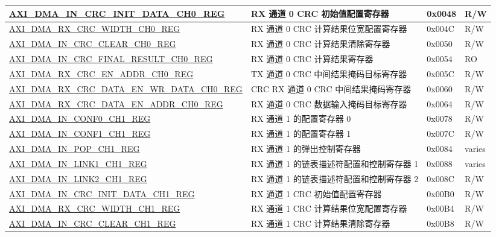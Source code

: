 \begin{longtable}{ | l | l | p{1.3cm} | l | }
\hyperref[regdesc:AXIDMAINCRCINITDATACHNREG]{AXI\_DMA\_IN\_CRC\_INIT\_DATA\_CH0\_REG} & RX 通道 0 CRC 初始值配置寄存器 & 0x0048 & R/W \\ \hline
\hyperref[regdesc:AXIDMARXCRCWIDTHCHNREG]{AXI\_DMA\_RX\_CRC\_WIDTH\_CH0\_REG} & RX 通道 0 CRC 计算结果位宽配置寄存器 & 0x004C & R/W \\ \hline
\hyperref[regdesc:AXIDMAINCRCCLEARCHNREG]{AXI\_DMA\_IN\_CRC\_CLEAR\_CH0\_REG} & RX 通道 0 CRC 计算结果清除寄存器 & 0x0050 & R/W \\ \hline
\hyperref[regdesc:AXIDMAINCRCFINALRESULTCHNREG]{AXI\_DMA\_IN\_CRC\_FINAL\_RESULT\_CH0\_REG} & RX 通道 0 CRC 计算结果寄存器 & 0x0054 & RO \\ \hline
\hyperref[regdesc:AXIDMARXCRCENADDRCHNREG]{AXI\_DMA\_RX\_CRC\_EN\_ADDR\_CH0\_REG} & TX 通道 0 CRC 中间结果掩码目标寄存器 & 0x005C & R/W \\ \hline
\hyperref[regdesc:AXIDMARXCRCDATAENWRDATACHNREG]{AXI\_DMA\_RX\_CRC\_DATA\_EN\_WR\_DATA\_CH0\_REG} & CRC RX 通道 0 CRC 中间结果掩码寄存器 & 0x0060 & R/W \\ \hline
\hyperref[regdesc:AXIDMARXCRCDATAENADDRCHNREG]{AXI\_DMA\_RX\_CRC\_DATA\_EN\_ADDR\_CH0\_REG} & RX 通道 0 CRC 数据输入掩码目标寄存器 & 0x0064 & R/W \\ \hline
\hyperref[regdesc:AXIDMAINCONF0CHNREG]{AXI\_DMA\_IN\_CONF0\_CH1\_REG} & RX 通道 1 的配置寄存器 0 & 0x0078 & R/W \\ \hline
\hyperref[regdesc:AXIDMAINCONF1CHNREG]{AXI\_DMA\_IN\_CONF1\_CH1\_REG} & RX 通道 1 的配置寄存器 1 & 0x007C & R/W \\ \hline
\hyperref[regdesc:AXIDMAINPOPCHNREG]{AXI\_DMA\_IN\_POP\_CH1\_REG} & RX 通道 1 的弹出控制寄存器 & 0x0084 & varies \\ \hline
\hyperref[regdesc:AXIDMAINLINK1CHNREG]{AXI\_DMA\_IN\_LINK1\_CH1\_REG} & RX 通道 1 的链表描述符配置和控制寄存器 1 & 0x0088 & varies \\ \hline
\hyperref[regdesc:AXIDMAINLINK2CHNREG]{AXI\_DMA\_IN\_LINK2\_CH1\_REG} & RX 通道 1 的链表描述符配置和控制寄存器 2 & 0x008C & R/W \\ \hline
\hyperref[regdesc:AXIDMAINCRCINITDATACHNREG]{AXI\_DMA\_IN\_CRC\_INIT\_DATA\_CH1\_REG} & RX 通道 1 CRC 初始值配置寄存器 & 0x00B0 & R/W \\ \hline
\hyperref[regdesc:AXIDMARXCRCWIDTHCHNREG]{AXI\_DMA\_RX\_CRC\_WIDTH\_CH1\_REG} & RX 通道 1 CRC 计算结果位宽配置寄存器 & 0x00B4 & R/W \\ \hline
\hyperref[regdesc:AXIDMAINCRCCLEARCHNREG]{AXI\_DMA\_IN\_CRC\_CLEAR\_CH1\_REG} & RX 通道 1 CRC 计算结果清除寄存器 & 0x00B8 & R/W \\ \hline

\end{longtable}
